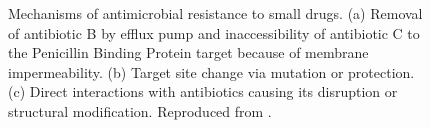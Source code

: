 \begin{figure}[h]
\begin{center}
\caption[Mechanisms of antimicrobial resistance to small drugs]{Mechanisms of antimicrobial resistance to small drugs. (a) Removal of antibiotic B by efflux pump and inaccessibility of antibiotic C to the Penicillin Binding Protein target because of membrane impermeability. (b) Target site change via mutation or protection. (c) Direct interactions with antibiotics causing its disruption or structural modification. Reproduced from \citet{Blair2014}.} \label{fig:amr}
\end{center}
\end{figure}

